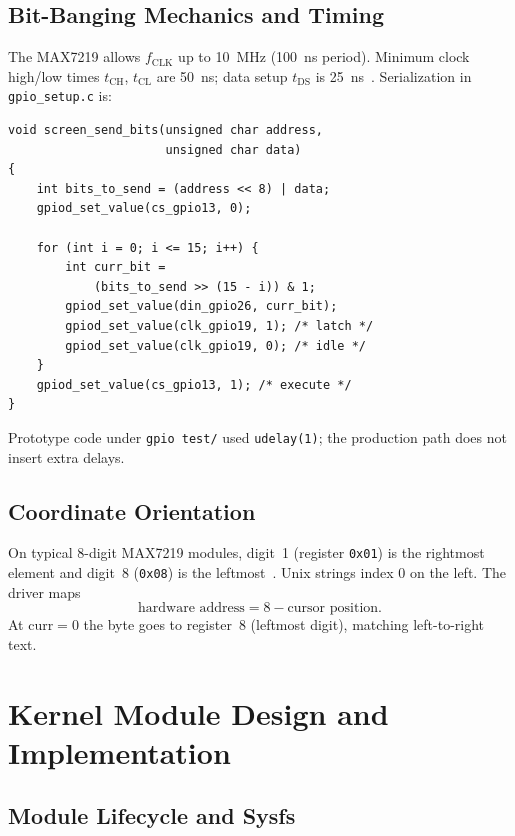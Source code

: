 \documentclass[conference,a4paper]{IEEEtran}
\begin{document}
\subsection{Bit-Banging Mechanics and Timing}

The MAX7219 allows $f_{\mathrm{CLK}}$ up to 10~MHz (100~ns period). Minimum clock high/low times $t_{\mathrm{CH}}$, $t_{\mathrm{CL}}$ are 50~ns; data setup $t_{\mathrm{DS}}$ is 25~ns~\cite{max7219}. Serialization in \texttt{gpio\_setup.c} is:

\begin{lstlisting}
void screen_send_bits(unsigned char address,
                      unsigned char data)
{
    int bits_to_send = (address << 8) | data;
    gpiod_set_value(cs_gpio13, 0);

    for (int i = 0; i <= 15; i++) {
        int curr_bit =
            (bits_to_send >> (15 - i)) & 1;
        gpiod_set_value(din_gpio26, curr_bit);
        gpiod_set_value(clk_gpio19, 1); /* latch */
        gpiod_set_value(clk_gpio19, 0); /* idle */
    }
    gpiod_set_value(cs_gpio13, 1); /* execute */
}
\end{lstlisting}

Prototype code under \texttt{gpio test/} used \texttt{udelay(1)}; the production path does not insert extra delays.

\subsection{Coordinate Orientation}

On typical 8-digit MAX7219 modules, digit~1 (register \texttt{0x01}) is the rightmost element and digit~8 (\texttt{0x08}) is the leftmost~\cite{max7219}. Unix strings index 0 on the left. The driver maps
\begin{equation}
\text{hardware address} = 8 - \text{cursor position}.
\end{equation}
At $\mathrm{curr}=0$ the byte goes to register~8 (leftmost digit), matching left-to-right text.

\FloatBarrier
\section{Kernel Module Design and Implementation}
\label{sec:kmod}

\subsection{Module Lifecycle and Sysfs}
\end{document}
